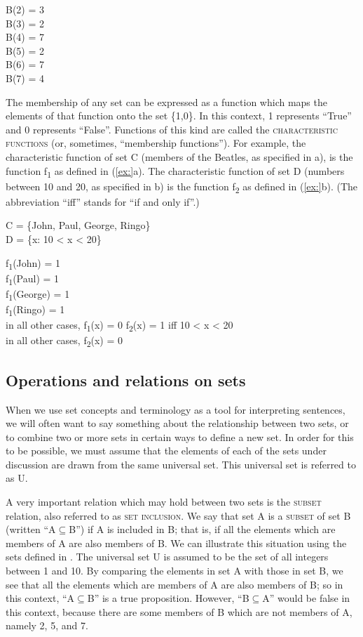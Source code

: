 \ea
B(2) = 3\\
B(3) = 2\\
B(4) = 7\\
B(5) = 2\\
B(6) = 7\\
B(7) = 4
\z


The membership of any set can be expressed as a function which maps the elements of that function onto the set \{1,0\}. In this context, 1 represents “True” and 0 represents “False”. Functions of this kind are called the \textsc{characteristic functions} (or, sometimes, “membership functions”). For example, the characteristic function of set C (members of the Beatles, as specified in a), is the function f\textsubscript{1} as defined in (\ref{ex:}a). The characteristic function of set D (numbers between 10 and 20, as specified in b) is the function f\textsubscript{2} as defined in (\ref{ex:}b). (The abbreviation “iff” stands for “if and only if”.)


\ea
\ea C = \{John, Paul, George, Ringo\}\\
\ex D = \{x: 10 < x < 20\}
                       \z
\z

\ea
\ea  f\textsubscript{1}(John) = 1\\
f\textsubscript{1}(Paul) = 1\\
f\textsubscript{1}(George) = 1\\
f\textsubscript{1}(Ringo) = 1\\
in all other cases, f\textsubscript{1}(x) = 0
\ex f\textsubscript{2}(x) = 1 iff 10 < x < 20\\
in all other cases, f\textsubscript{2}(x) = 0
\z \z

\subsection{Operations and relations on sets}\label{sec:13.3.2}

When we use set concepts and terminology as a tool for interpreting sentences, we will often want to say something about the relationship between two sets, or to combine two or more sets in certain ways to define a new set. In order for this to be possible, we must assume that the elements of each of the sets under discussion are drawn from the same universal set. This universal set is referred to as U.



A very important relation which may hold between two sets is the \textsc{subset} relation, also referred to as \textsc{set} \textsc{inclusion}. We say that set A is a \textsc{subset} of set B (written “A${\subseteq}$B”) if A is included in B; that is, if all the elements which are members of A are also members of B. We can illustrate this situation using the sets defined in . The universal set U is assumed to be the set of all integers between 1 and 10. By comparing the elements in set A with those in set B, we see that all the elements which are members of A are also members of B; so in this context, “A${\subseteq}$B” is a true proposition. However, “B${\subseteq}$A” would be false in this context, because there are some members of B which are not members of A, namely 2, 5, and 7.


